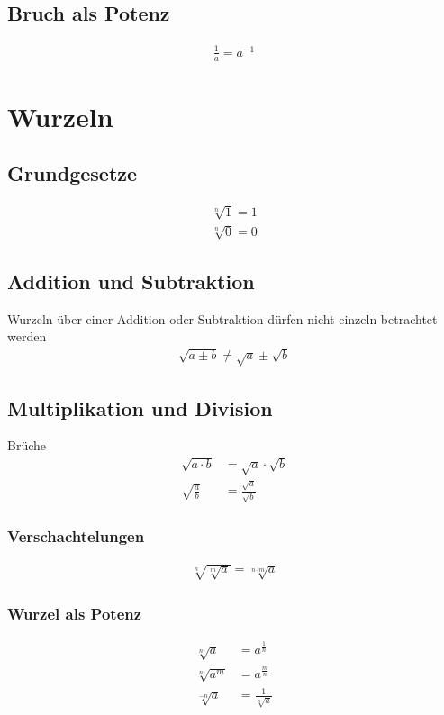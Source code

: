 \subsection{Bruch als Potenz}
\begin{align*}
\frac{1}{a} = a^{-1}
\end{align*}

\section{Wurzeln}
\subsection{Grundgesetze}
\begin{align*}
\sqrt[n]{1} = 1 \\
\sqrt[n]{0} = 0
\end{align*}

\subsection{Addition und Subtraktion}
Wurzeln über einer Addition oder Subtraktion dürfen nicht einzeln betrachtet werden
\begin{align*}
\sqrt{a \pm b} \neq \sqrt{a} \pm \sqrt{b}
\end{align*}

\subsection{Multiplikation und Division}
Brüche
\begin{align*}
\sqrt{a \cdot b} &= \sqrt{a} \cdot \sqrt{b} \\
\sqrt{\frac{a}{b}} &= \frac{\sqrt{a}}{\sqrt{b}} 
\end{align*}

\subsubsection{Verschachtelungen}
\begin{align*}
\sqrt[n]{\sqrt[m]{a}} = \sqrt[n \cdot m]{a}
\end{align*}

\subsubsection{Wurzel als Potenz}
\begin{align*}
\sqrt[n]{a} &= a^{\frac{1}{n}} \\
\sqrt[n]{a^m} &= a^{\frac{m}{n}} \\
\sqrt[-n]{a} &= \frac{1}{\sqrt[n]{a}}
\end{align*}

